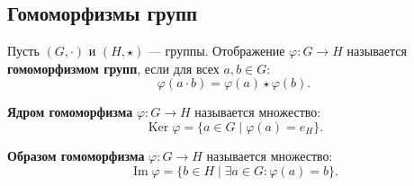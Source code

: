 \documentclass[10pt]{article}
\begin{document}
\subsection{Гомоморфизмы групп}
\begin{definition}
Пусть $(G, \cdot)$ и $(H, \star)$ — группы. Отображение $\varphi: G \to H$ называется \textbf{гомоморфизмом групп}, если для всех $a, b \in G$:
$$\varphi(a \cdot b) = \varphi(a) \star \varphi(b).$$
\end{definition}

\begin{definition}
\textbf{Ядром гомоморфизма} $\varphi: G \to H$ называется множество:
$$\operatorname{Ker}\varphi = \{a \in G \mid \varphi(a) = e_H\}.$$
\end{definition}

\begin{definition}
\textbf{Образом гомоморфизма} $\varphi: G \to H$ называется множество:
$$\operatorname{Im}\varphi = \{b \in H \mid \exists a \in G: \varphi(a) = b\}.$$
\end{definition}
\end{document}
